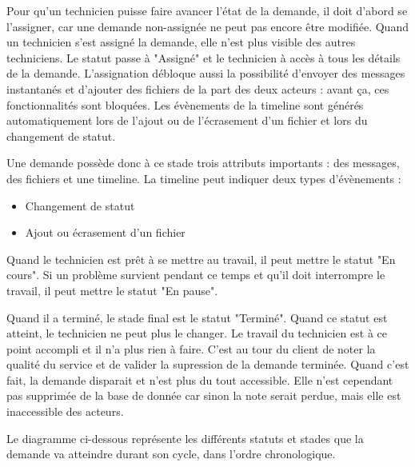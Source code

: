 \documentclass[
    iai, %
    eai, %
]{heig-tb}
\begin{document}
Pour qu'un technicien puisse faire avancer l'état de la demande, il doit d'abord se l'assigner, car une demande non-assignée ne peut pas encore être modifiée.
Quand un technicien s'est assigné la demande, elle n'est plus visible des autres techniciens. Le statut passe à "Assigné" et le technicien à accès à tous les détails de la demande.
L'assignation débloque aussi la possibilité d'envoyer des messages instantanés et d'ajouter des fichiers de la part des deux acteurs : avant ça, ces fonctionnalités sont bloquées.
Les évènements de la timeline sont générés automatiquement lors de l'ajout ou de l'écrasement d'un fichier et lors du changement de statut.

Une demande possède donc à ce stade trois attributs importants : des messages, des fichiers et une timeline.
La timeline peut indiquer deux types d'évènements :
\begin{itemize}
  \item Changement de statut
  \item Ajout ou écrasement d'un fichier
\end{itemize}

\newpage
Quand le technicien est prêt à se mettre au travail, il peut mettre le statut "En cours". Si un problème survient pendant ce temps et qu'il doit interrompre le travail, il peut mettre le statut "En pause".

Quand il a terminé, le stade final est le statut "Terminé". Quand ce statut est atteint, le technicien ne peut plus le changer. Le travail du technicien est à ce point accompli et il n'a plus rien à faire. C'est au tour du client de noter la qualité du service et de valider la supression de la demande terminée. Quand c'est fait, la demande disparait et n'est plus du tout accessible. Elle n'est cependant pas supprimée de la base de donnée car sinon la note serait perdue, mais elle est inaccessible des acteurs.

Le diagramme ci-dessous représente les différents statuts et stades que la demande va atteindre durant son cycle, dans l'ordre chronologique.

\end{document}
